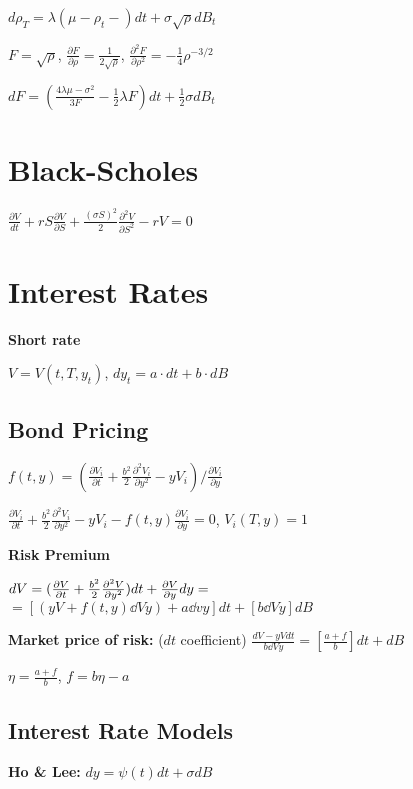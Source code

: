 $d\rho_T = \lambda(\mu - \rho_t - )dt + \sigma\sqrt{\rho} dB_t $

$F = \sqrt{\rho}$, $\frac{\partial F}{\partial \rho} = \frac{1}{2\sqrt{\rho}}$, $\frac{\partial^2 F}{\partial \rho^2} = -\frac{1}{4}\rho^{-3/2}$

$dF = (\frac{4\lambda \mu - \sigma^2}{3F} -\frac{1}{2}\lambda F)dt + \frac{1}{2}\sigma dB_t$

\section{Black-Scholes}

$\frac{\partial V}{dt} + r S \frac{\partial V}{\partial S} + \frac{(\sigma S)^2}{2}\frac{\partial^2 V}{\partial S^2} - rV = 0 $


\section{Interest Rates}

\textbf{Short rate}

$V = V(t, T, y_t)$, $dy_t = a \cdot dt + b \cdot  dB$

\subsection{Bond Pricing}

$f(t,y) = (\frac{\partial V_i}{\partial t} + \frac{b^2}{2}\frac{\partial^2 V_i}{\partial y^2} -yV_i  )/\frac{\partial V_i}{\partial y}$

$\frac{\partial V_i}{\partial t} + \frac{b^2}{2} \frac{\partial^2 V_i}{\partial y^2} - yV_i -f(t,y)\frac{\partial V_i}{\partial y} = 0$, $V_i(T,y) = 1$

\textbf{Risk Premium}

$dV = ( \frac{\partial V}{\partial t} + \frac{b^2}{2}\frac{\partial^{2} V}{\partial y^{2}} )dt + \frac{\partial V}{\partial y} dy =$ \\ $ = [ (yV + f(t,y)\dd{V}{y}) + a \dd{v}{y} ]dt + [b \dd{V}{y}]dB$

\textbf{Market price of risk:} ($dt$ coefficient) $\frac{dV - yV dt}{b \dd{V}{y}} = [\frac{a+f}{b}]dt + dB$

$\eta = \frac{a+f}{b}$, $f = b\eta -a $

\subsection{Interest Rate Models}

\textbf{Ho \& Lee:} $dy = \psi (t) dt + \sigma dB$

